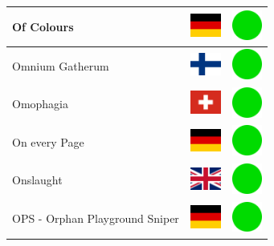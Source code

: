 \documentclass[12pt, a4paper, twoside]{report}
\begin{document}
\begin{center}
\begin{longtable}{|p{5cm}|p{2cm}|p{2cm}|}
 Of Colours                                                 & \includegraphics[width=1cm]{4x3/de} &   \includegraphics[width=1cm]{likes/y} \\ \hline
 Omnium Gatherum                                            & \includegraphics[width=1cm]{4x3/fi} &   \includegraphics[width=1cm]{likes/y} \\ \hline
 Omophagia                                                  & \includegraphics[width=1cm]{4x3/ch} &   \includegraphics[width=1cm]{likes/y} \\ \hline
 On every Page                                              & \includegraphics[width=1cm]{4x3/de} &   \includegraphics[width=1cm]{likes/y} \\ \hline
 Onslaught                                                  & \includegraphics[width=1cm]{4x3/gb} &   \includegraphics[width=1cm]{likes/y} \\ \hline
 OPS - Orphan Playground Sniper                             & \includegraphics[width=1cm]{4x3/de} &   \includegraphics[width=1cm]{likes/y} \\ \hline

\end{longtable}
\end{center}
\end{document}

